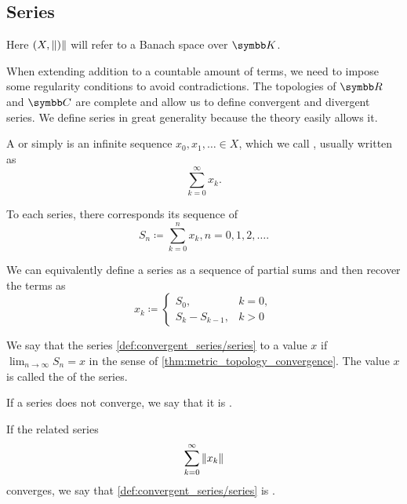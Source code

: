 \subsection{Series}\label{subsec:series}

Here \( (X, \left\Vert ) \right\Vert \) will refer to a Banach space over \( \K \).

\begin{definition}\label{def:convergent_series}
  When extending addition to a countable amount of terms, we need to impose some regularity conditions to avoid contradictions. The topologies of \( \R \) and \( \C \) are complete and allow us to define convergent and divergent series. We define series in great generality because the theory easily allows it.

  A  or simply  is an infinite sequence \( x_0, x_1, \ldots \in X \), which we call , usually written as
  \begin{equation}\label{def:convergent_series/series}
    \sum_{k=0}^\infty x_k.
  \end{equation}

  To each series, there corresponds its sequence of 
  \begin{equation*}
    S_n \coloneqq \sum_{k=0}^n x_k, n = 0, 1, 2, \ldots.
  \end{equation*}

  We can equivalently define a series as a sequence of partial sums and then recover the terms as
  \begin{equation*}
    x_k \coloneqq \begin{cases}
      S_0,           &k = 0, \\
      S_k - S_{k-1}, &k > 0
    \end{cases}
  \end{equation*}

  We say that the series \cref{def:convergent_series/series}  to a value \( x \) if \( \lim_{n \to \infty} S_n = x \) in the sense of \cref{thm:metric_topology_convergence}. The value \( x \) is called the  of the series.

  If a series does not converge, we say that it is .

  If the related series
  \begin{equation}\label{def:convergent_series/absolute_series}
    \sum_{k=0}^\infty \left\Vert x_k \right\Vert
  \end{equation}
  converges, we say that \cref{def:convergent_series/series} is .
\end{definition}

